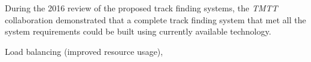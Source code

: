 During the 2016 review of the proposed track finding systems, the \emph{TMTT} collaboration demonstrated that a complete track finding system that met all the system requirements could be built using currently available technology.

Load balancing (improved resource usage), 


%
